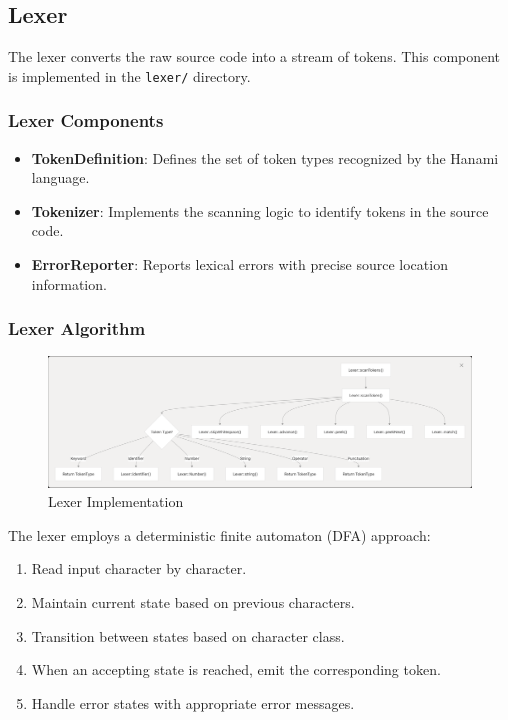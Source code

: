 \documentclass[conference]{IEEEtran}
\begin{document}
\subsection{Lexer}
The lexer converts the raw source code into a stream of tokens. This component is implemented in the \texttt{lexer/} directory.

\subsubsection{Lexer Components}
\begin{itemize}
    \item \textbf{TokenDefinition}: Defines the set of token types recognized by the Hanami language.
    \item \textbf{Tokenizer}: Implements the scanning logic to identify tokens in the source code.
    \item \textbf{ErrorReporter}: Reports lexical errors with precise source location information.
\end{itemize}

\subsubsection{Lexer Algorithm}
\begin{figure}[H] %
        \centering
        \includegraphics[width=1\linewidth]{lexer_imp.png} %
        \caption{Lexer Implementation}
        \label{fig:lexer_imp} %
    \end{figure}
The lexer employs a deterministic finite automaton (DFA) approach:
\begin{enumerate}
    \item Read input character by character.
    \item Maintain current state based on previous characters.
        \item Transition between states based on character class.
    \item When an accepting state is reached, emit the corresponding token.
    \item Handle error states with appropriate error messages.
\end{enumerate}
\end{document}
